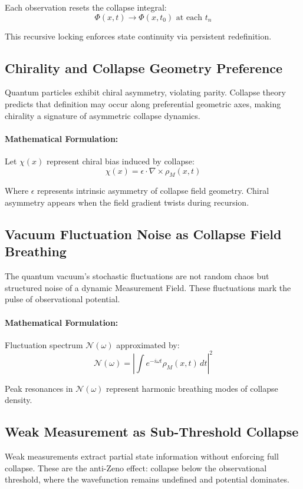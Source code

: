 Each observation resets the collapse integral:
\begin{equation}
\Phi(x,t) \rightarrow \Phi(x,t_0) \text{ at each } t_n
\end{equation}

This recursive locking enforces state continuity via persistent redefinition.

\subsection{Chirality and Collapse Geometry Preference}
Quantum particles exhibit chiral asymmetry, violating parity. Collapse theory predicts that definition may occur along preferential geometric axes, making chirality a signature of asymmetric collapse dynamics.

\paragraph{Mathematical Formulation:}
Let $\chi(x)$ represent chiral bias induced by collapse:
\begin{equation}
\chi(x) = \epsilon \cdot \nabla \times \rho_M(x,t)
\end{equation}

Where $\epsilon$ represents intrinsic asymmetry of collapse field geometry. Chiral asymmetry appears when the field gradient twists during recursion.

\subsection{Vacuum Fluctuation Noise as Collapse Field Breathing}
The quantum vacuum's stochastic fluctuations are not random chaos but structured noise of a dynamic Measurement Field. These fluctuations mark the pulse of observational potential.

\paragraph{Mathematical Formulation:}
Fluctuation spectrum $\mathcal{N}(\omega)$ approximated by:
\begin{equation}
\mathcal{N}(\omega) = \left| \int e^{-i\omega t} \rho_M(x,t) \, dt \right|^2
\end{equation}

Peak resonances in $\mathcal{N}(\omega)$ represent harmonic breathing modes of collapse density.

\subsection{Weak Measurement as Sub-Threshold Collapse}
Weak measurements extract partial state information without enforcing full collapse. These are the anti-Zeno effect: collapse below the observational threshold, where the wavefunction remains undefined and potential dominates.

